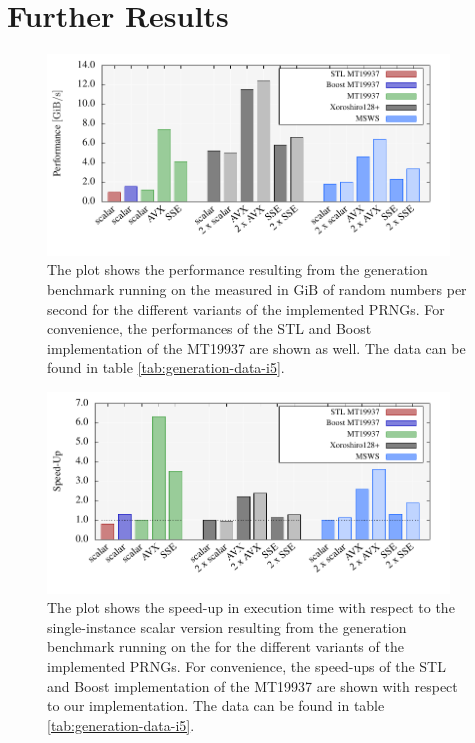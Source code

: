 \documentclass{stdlocal}
\begin{document}
\section{Further Results} %
\label{sec:further_results}
  \begin{figure}[H]
    \center
    \includegraphics[width=0.95\textwidth]{plots/generation_laptop.pdf}
    \caption[Generation Benchmark Performance for ]{%
      The plot shows the performance resulting from the generation benchmark running on the  measured in $\mathrm{GiB}$ of random numbers per second for the different variants of the implemented PRNGs.
      For convenience, the performances of the STL and Boost implementation of the MT19937 are shown as well.
      The data can be found in table \ref{tab:generation-data-i5}.
    }
  \end{figure}

  \begin{figure}[H]
    \center
    \includegraphics[width=0.95\textwidth]{plots/generation_laptop_speedup.pdf}
    \caption[Generation Benchmark Speed-Up for ]{%
      The plot shows the speed-up in execution time with respect to the single-instance scalar version resulting from the generation benchmark running on the  for the different variants of the implemented PRNGs.
      For convenience, the speed-ups of the STL and Boost implementation of the MT19937 are shown with respect to our implementation.
      The data can be found in table \ref{tab:generation-data-i5}.
    }
  \end{figure}
\end{document}

